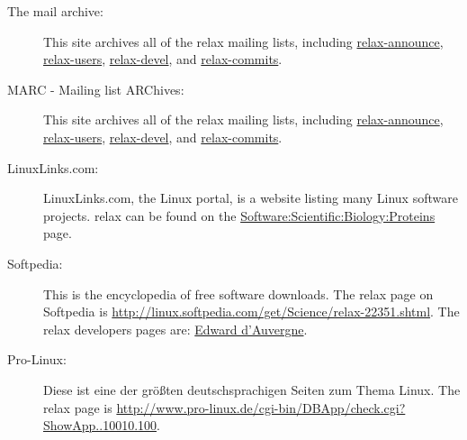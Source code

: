 \begin{description}
  \item[The mail archive:]  This site archives all of the relax mailing lists, including \href{http://mail-archive.com/relax-announce@gna.org/}{relax-announce}, \href{http://mail-archive.com/relax-users@gna.org/}{relax-users}, \href{http://mail-archive.com/relax-devel@gna.org/}{relax-devel}, and \href{http://mail-archive.com/relax-commits@gna.org/}{relax-commits}.
  \item[MARC -  Mailing list ARChives:]  This site archives all of the relax mailing lists, including \href{http://marc.info/?l=relax-announce&r=1&w=2}{relax-announce}, \href{http://marc.info/?l=relax-users&r=1&w=2}{relax-users}, \href{http://marc.info/?l=relax-devel&r=1&w=2}{relax-devel}, and \href{http://marc.info/?l=relax-commits&r=1&w=2}{relax-commits}.
  \item[LinuxLinks.com:]  LinuxLinks.com, the Linux portal, is a website listing many Linux software projects.
    relax can be found on the \href{http://linuxlinks.com/Software/Scientific/Biology/Proteins/}{Software:\-Scientific:\-Biology:\-Proteins} page.
  \item[Softpedia:]  This is the encyclopedia of free software downloads.
    The relax page on Softpedia is \href{http://linux.softpedia.com/get/Science/relax-22351.shtml}{http://linux.softpedia.com/get/Science/relax-22351.shtml}.
    The relax developers pages are:  \href{http://linux.softpedia.com/developer/Edward-d-039-Auvergne-5136.html}{Edward d'Auvergne}.
  \item[Pro-Linux:]  Diese ist eine der gr\"o{\ss}ten deutschsprachigen Seiten zum Thema Linux.
    The relax page is \href{http://www.pro-linux.de/cgi-bin/DBApp/check.cgi?ShowApp..10010.100}{http://\-www.\-pro\--linux.\-de/\-cgi\--bin/\-DB\-App/\-check\-.cgi\-?ShowApp..10010.100}.
\end{description}
